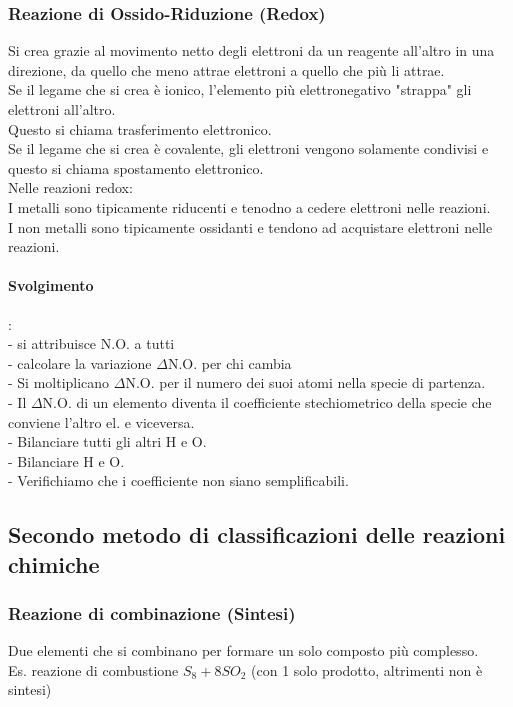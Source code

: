 \subsubsection{Reazione di Ossido-Riduzione (Redox)}
Si crea grazie al movimento netto degli elettroni da un reagente all'altro in una direzione, da quello che meno attrae elettroni a quello che più li attrae.\\
Se il legame che si crea è ionico, l'elemento più elettronegativo "strappa" gli elettroni all'altro.\\
Questo si chiama trasferimento elettronico.\\
Se il legame che si crea è covalente, gli elettroni vengono solamente condivisi e questo si chiama spostamento elettronico.\\
Nelle reazioni redox:\\
I metalli sono tipicamente riducenti e tenodno a cedere elettroni nelle reazioni.\\
I non metalli sono tipicamente ossidanti e tendono ad acquistare elettroni nelle reazioni.\\
\begin{table}
\end{table}
\paragraph*{Svolgimento}:\\
\tab- si attribuisce N.O. a tutti\\
\tab- calcolare la variazione $\Delta$N.O. per chi cambia\\
\tab- Si moltiplicano $\Delta$N.O. per il numero dei suoi atomi nella specie di partenza.\\
\tab- Il $\Delta$N.O. di un elemento diventa il coefficiente stechiometrico della specie che conviene l'altro el. e viceversa.\\
\tab- Bilanciare tutti gli altri H e O.\\
\tab- Bilanciare H e O.\\
\tab- Verifichiamo che i coefficiente non siano semplificabili.
\subsection{Secondo metodo di classificazioni delle reazioni chimiche}
\subsubsection{Reazione di combinazione (Sintesi)}
Due elementi che si combinano per formare un solo composto più complesso.\\
Es. reazione di combustione $S_8 + 8SO_2$ (con 1 solo prodotto, altrimenti non è sintesi)
